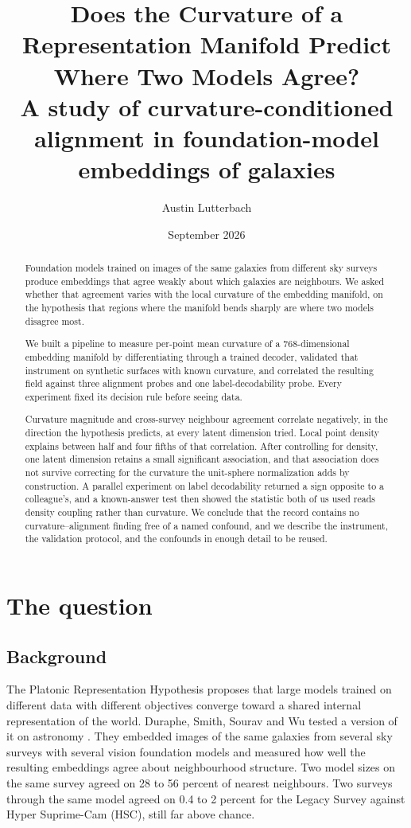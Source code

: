 \documentclass[11pt,a4paper]{article}
\title{Does the Curvature of a Representation Manifold Predict Where Two Models Agree?\\[0.5em]
\large A study of curvature-conditioned alignment in foundation-model embeddings of galaxies}
\author{Austin Lutterbach\\
}
\date{September 2026}
\begin{document}
\maketitle

\begin{abstract}
Foundation models trained on images of the same galaxies from different sky surveys produce embeddings that agree weakly about which galaxies are neighbours. We asked whether that agreement varies with the local curvature of the embedding manifold, on the hypothesis that regions where the manifold bends sharply are where two models disagree most.

We built a pipeline to measure per-point mean curvature of a 768-dimensional embedding manifold by differentiating through a trained decoder, validated that instrument on synthetic surfaces with known curvature, and correlated the resulting field against three alignment probes and one label-decodability probe. Every experiment fixed its decision rule before seeing data.

Curvature magnitude and cross-survey neighbour agreement correlate negatively, in the direction the hypothesis predicts, at every latent dimension tried. Local point density explains between half and four fifths of that correlation. After controlling for density, one latent dimension retains a small significant association, and that association does not survive correcting for the curvature the unit-sphere normalization adds by construction. A parallel experiment on label decodability returned a sign opposite to a colleague's, and a known-answer test then showed the statistic both of us used reads density coupling rather than curvature. We conclude that the record contains no curvature--alignment finding free of a named confound, and we describe the instrument, the validation protocol, and the confounds in enough detail to be reused.
\end{abstract}

\section{The question}

\subsection{Background}

The Platonic Representation Hypothesis proposes that large models trained on different data with different objectives converge toward a shared internal representation of the world. Duraphe, Smith, Sourav and Wu tested a version of it on astronomy \citep{duraphe2025platonic}. They embedded images of the same galaxies from several sky surveys with several vision foundation models and measured how well the resulting embeddings agree about neighbourhood structure. Two model sizes on the same survey agreed on 28 to 56 percent of nearest neighbours. Two surveys through the same model agreed on 0.4 to 2 percent for the Legacy Survey against Hyper Suprime-Cam (HSC), still far above chance.
\end{document}
